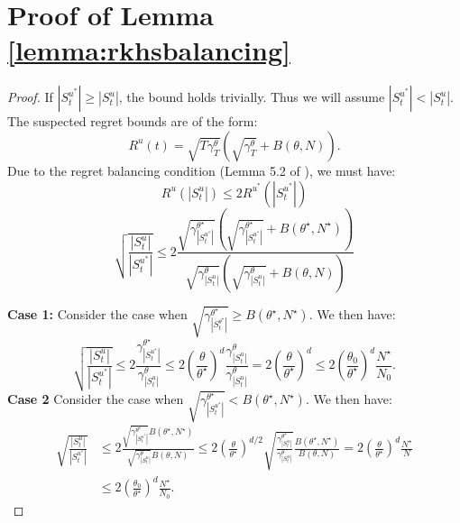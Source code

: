 \documentclass{article}
\theoremstyle{plain}
\theoremstyle{definition}
\theoremstyle{remark}
\theoremstyle{plain}
\begin{document}
\section{Proof of Lemma \ref{lemma:rkhsbalancing}} \label{app:rkhsbalancing_proof}
\rkhsbalancing*
\begin{proof}
    If $|S_t^{u^*}| \ge |S_t^{u}|$, the bound holds trivially. Thus we will assume $|S_t^{u^*}| < |S_t^{u}|$. The suspected regret bounds are of the form:
    \begin{equation*}
        R^u(t) = \sqrt{T\gamma_T^\theta} \left( \sqrt{\gamma_T^\theta} + B(\theta, N) \right) .
    \end{equation*}
    Due to the regret balancing condition (Lemma 5.2 of \cite{pacchiano2020regret}), we must have:
    \begin{equation*}
         R^{u}(|S_t^{u}|) \le  2R^{u^*}(|S_t^{u^*}|)
    \end{equation*}
    \begin{equation*}
         \sqrt{\frac{|S_t^{u}|}{|S_t^{u^*}|}}  \le  2 \frac{ \sqrt{\gamma_{|S_t^{u^*}|}^{\theta^\star}} \left( \sqrt{\gamma_{|S_t^{u^*}|}^{\theta^\star}} + B(\theta^\star, N^\star)\right)}{ \sqrt{\gamma_{|S_t^{u}|}^{\theta}} \left( \sqrt{\gamma_{|S_t^{u}|}^{\theta}} + B(\theta, N)\right)}
    \end{equation*}
    
    \textbf{Case 1:} Consider the case when $\sqrt{\gamma_{|S_t^{\theta^\star}|}^{\theta^\star}} \ge B(\theta^\star, N^\star)$. We then have:
    \begin{equation*}
         \sqrt{\frac{|S_t^{u}|}{|S_t^{u^*}|}}  \le  2 \frac{ \gamma_{|S_t^{u^*}|}^{\theta^\star}}{ \gamma_{|S_t^{u}|}^\theta} \le 2 \left(\frac{\theta}{\theta^\star} \right)^{d} \frac{ \gamma_{|S_t^{u}|}^\theta}{ \gamma_{|S_t^{u}|}^\theta} = 2 \left(\frac{\theta}{\theta^\star}  \right)^{d} \le  2 \left(\frac{\theta_0}{\theta^\star}  \right)^{d} \frac{N^\star}{N_0} .
    \end{equation*}
    \textbf{Case 2} Consider the case when $\sqrt{\gamma_{|S_t^{u^*}|}^{\theta^\star}} < B(\theta^\star, N^\star)$. We then have:
    \begin{align*}
         \sqrt{\frac{|S_t^{u}|}{|S_t^{u^*}|}}  &\le  2 \frac{ \sqrt{\gamma_{|S_t^{u^*}|}^{\theta^\star}}B(\theta^\star, N^\star)}{ \sqrt{\gamma_{|S_t^{u}|}^\theta} B(\theta, N)} \le  2 \left(\frac{\theta}{\theta^\star} \right)^{d/2} \sqrt{\frac{ \gamma_{|S_t^{u}|}^{\theta^\star}}{ \gamma_{|S_t^{u}|}^\theta}} \frac{B(\theta^\star, N^\star)}{B(\theta, N)} = 2 \left(\frac{\theta}{\theta^\star} \right)^{d} \frac{N^\star}{N} \\
         & \le 2 \left(\frac{\theta_0}{\theta^\star}  \right)^{d} \frac{N^\star}{N_0}  .
    \end{align*}

\end{proof}
\end{document}
